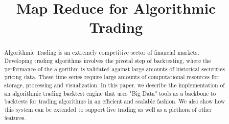 \documentclass[10pt, conference, compsocconf]{IEEEtran}
\begin{document}
%
\title{Map Reduce for Algorithmic Trading}



\author{

}


% 







\maketitle


\begin{abstract}
Algorithmic Trading is an extremely competitive sector of financial markets. Developing trading algorithms involves the pivotal step of backtesting, where the performance of the algorithm is validated against large amounts of historical securities pricing data. These time series require large amounts of computational resources for storage, processing and visualization. In this paper, we describe the implementation of an algorithmic trading backtest engine that uses "Big Data" tools as a backbone to backtests for trading algorithms in an efficient and scalable fashion.
We also show how this system can be extended to support live trading as well as a plethora of other features.

\end{abstract}
\end{document}
